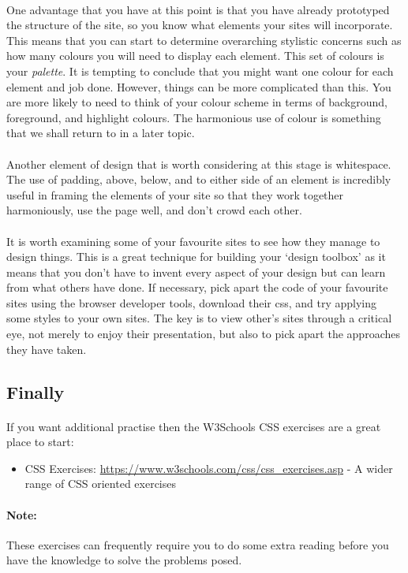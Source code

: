 \documentclass[10pt, a4paper]{article}
\begin{document}
\paragraph{} One advantage that you have at this point is that you have already prototyped the structure of the site, so you know what elements your sites will incorporate. This means that you can start to determine overarching stylistic concerns such as how many colours you will need to display each element. This set of colours is your \emph{palette}. It is tempting to conclude that you might want one colour for each element and job done. However, things can be more complicated than this. You are more likely to need to think of your colour scheme in terms of background, foreground, and highlight colours. The harmonious use of colour is something that we shall return to in a later topic. 

\paragraph{} Another element of design that is worth considering at this stage is whitespace. The use of padding, above, below, and to either side of an element is incredibly useful in framing the elements of your site so that they work together harmoniously, use the page well, and don't crowd each other.

\paragraph{} It is worth examining some of your favourite sites to see how they manage to design things. This is a great technique for building your `design toolbox' as it means that you don't have to invent every aspect of your design but can learn from what others have done. If necessary, pick apart the code of your favourite sites using the browser developer tools, download their css, and try applying some styles to your own sites. The key is to view other's sites through a critical eye, not merely to enjoy their presentation, but also to pick apart the approaches they have taken. 

\subsection{Finally}
\paragraph{} If you want additional practise then the W3Schools CSS exercises are a great place to start:
\begin{itemize}
\item CSS Exercises: \url{https://www.w3schools.com/css/css_exercises.asp} - A wider range of CSS oriented exercises
\end{itemize}

\paragraph{Note:} These exercises can frequently require you to do some extra reading before you have the knowledge to solve the problems posed.
\end{document}
